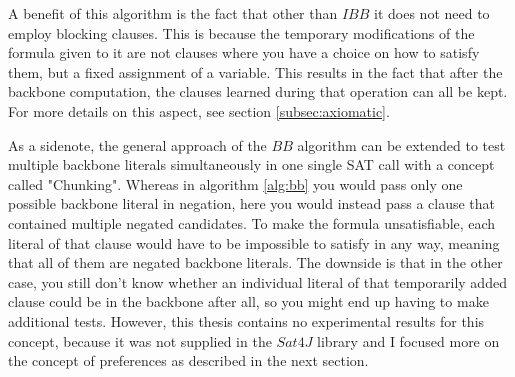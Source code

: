 A benefit of this algorithm is the fact that other than $IBB$ it does not need to employ blocking clauses. This is because the temporary modifications of the formula given to it are not clauses where you have a choice on how to satisfy them, but a fixed assignment of a variable. This results in the fact that after the backbone computation, the clauses learned during that operation can all be kept. For more details on this aspect, see section \ref{subsec:axiomatic}.


As a sidenote, the general approach of the $BB$ algorithm can be extended to test multiple backbone literals simultaneously in one single SAT call with a concept called "Chunking". Whereas in algorithm \ref{alg:bb} you would pass only one possible backbone literal in negation, here you would instead pass a clause that contained multiple negated candidates. To make the formula unsatisfiable, each literal of that clause would have to be impossible to satisfy in any way, meaning that all of them are negated backbone literals. The downside is that in the other case, you still don't know whether an individual literal of that temporarily added clause could be in the backbone after all, so you might end up having to make additional tests. However, this thesis contains no experimental results for this concept, because it was not supplied in the $Sat4J$ library and I focused more on the concept of preferences as described in the next section.



